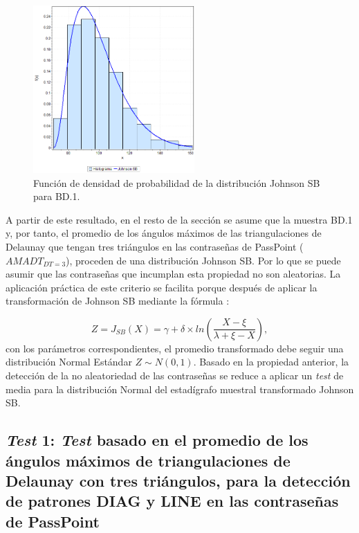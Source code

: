 \documentclass[12pt]{report}
\begin{document}
	  
	 \begin{figure}[htbp]
	 	\centering
	 	
	 	\includegraphics[width=0.55\textwidth]{3td_fdp.png}
	 	\caption{Función de densidad de probabilidad de la  distribución Johnson SB para BD.1.}
	 	\label{3TD_FDP}
	 \end{figure}
	 A partir de este resultado, en el resto de la sección se asume que la muestra BD.1 y, por tanto, el promedio de los ángulos máximos de las triangulaciones de Delaunay que tengan tres triángulos en las contraseñas de PassPoint ($AMADT_{DT=3}$), proceden de una distribución Johnson SB. Por lo que se puede asumir que las contraseñas que incumplan esta propiedad no son aleatorias.
	 La aplicación práctica de este criterio se facilita porque después de  aplicar la transformación de Johnson SB mediante la fórmula \cite{30}:
	 
	  
	 \[
	  Z=J_{SB}(X) = \gamma + \delta \times ln\left(\frac{X - \xi}{\lambda + \xi - X}\right),
	 \]
	 con los parámetros correspondientes, el promedio transformado debe seguir una distribución Normal Estándar $Z\sim N(0,1)$. Basado en la propiedad anterior, la detección de la no aleatoriedad de las contraseñas se reduce a aplicar un \textit{test} de media para la distribución Normal del estadígrafo muestral transformado Johnson SB.
	 
	 
	 
\subsection{\textit{Test} 1: \textit{Test} basado en el promedio de los ángulos máximos de triangulaciones de Delaunay con tres triángulos, para la detección de patrones DIAG y LINE en las contraseñas de PassPoint}
\label{sec:1.2}
\end{document}
